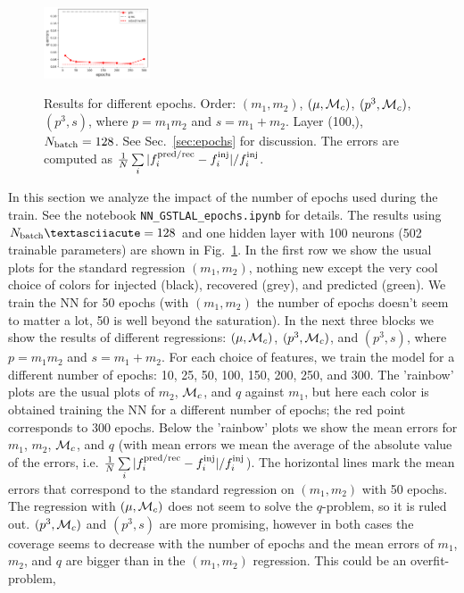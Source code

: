 \documentclass[prd,aps,twocolumn,a4paper,showkeys,nofootinbib]{revtex4-1}
\def\Mc{{\cal M}_c}
\begin{document}
\begin{figure}[]
  \includegraphics[width=0.28\textwidth]{./Figs/p3s_err_q.png} \\
  \caption{\label{fig:epochs} Results for different epochs. Order:
  $(m_1, m_2)$, $(\mu, \Mc)$, $(p^3, \Mc)$, $(p^3, s)$, where
  $p=m_1 m_2$ and $s=m_1+m_2$. Layer (100,), $N_{\rm batch}=128$. 
  See Sec.~\ref{sec:epochs} for discussion. The errors are computed as
  $\frac{1}{N} \sum\limits_i |f_i^{\rm pred/rec} - f_i^{\rm inj}|/f_i^{\rm inj}$. }
\end{figure}
%
In this section we analyze the impact of the number of epochs used during the train. See the notebook \texttt{NN{\_}GSTLAL{\_}epochs.ipynb} for details.
The results using $N_{\rm batch}´ = 128$ and one hidden
layer with 100 neurons (502 trainable parameters) are shown in Fig.~\ref{fig:epochs}.
In the first row we show the usual plots for the standard regression $(m_1, m_2)$, 
nothing new except the very cool choice of colors for injected (black), recovered (grey),
and predicted (green). We train the NN for 50 epochs (with $(m_1, m_2)$
the number of epochs doesn't seem to matter a lot, 50 is well beyond the saturation). 
In the next three blocks we show the results of different regressions:
$(\mu, \Mc)$, $(p^3, \Mc)$, and $(p^3, s)$, where $p=m_1 m_2$ and $s=m_1+m_2$.
For each choice of features, we train the model for a different
number of epochs: 10, 25, 50, 100, 150, 200, 250, and 300.
The 'rainbow' plots are the usual plots of $m_2$, $\Mc$, and $q$ against $m_1$, 
but here each color is obtained training the NN for a different number of epochs;
the red point corresponds to 300 epochs. Below the 'rainbow' plots we
show the mean errors for $m_1$, $m_2$, $\Mc$, and $q$ (with mean errors
we mean the average of the absolute value of the errors, i.e. 
$\frac{1}{N} \sum\limits_i |f_i^{\rm pred/rec} - f_i^{\rm inj}|/f_i^{\rm inj}$). 
The horizontal lines mark the mean errors that correspond to the standard regression
on $(m_1, m_2)$ with 50 epochs. The regression with 
$(\mu, \Mc)$ does not seem to solve the $q$-problem, so it is ruled out.
$(p^3, \Mc)$ and $(p^3, s)$ are more promising, however in both cases 
the coverage seems to decrease with the number of epochs and the 
mean errors of $m_1$, $m_2$, and $q$ are bigger than in the $(m_1, m_2)$ regression. 
This could be an overfit-problem,
\end{document}
